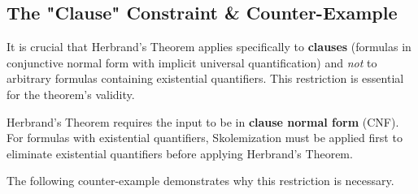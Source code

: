 \documentclass[11pt,a4paper]{article}
\theoremstyle{definition}
\theoremstyle{plain}
\theoremstyle{remark}
\begin{document}
\subsection{The "Clause" Constraint \& Counter-Example}

It is crucial that Herbrand's Theorem applies specifically to \textbf{clauses} (formulas in conjunctive normal form with implicit universal quantification) and \textit{not} to arbitrary formulas containing existential quantifiers. This restriction is essential for the theorem's validity.

\begin{tcolorbox}[colback=red!5!white,colframe=red!75!black,title=\textbf{Important Restriction}]
Herbrand's Theorem requires the input to be in \textbf{clause normal form} (CNF). For formulas with existential quantifiers, Skolemization must be applied first to eliminate existential quantifiers before applying Herbrand's Theorem.
\end{tcolorbox}

The following counter-example demonstrates why this restriction is necessary.
\end{document}
